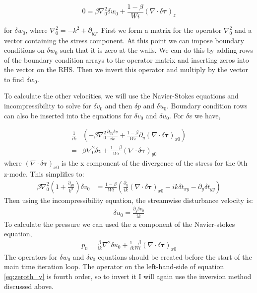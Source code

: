 \documentclass[12pt,a4paper]{article}
\newcommand{\styy}{\delta t_{yy}}
\newcommand{\stxy}{\delta t_{xy}}
\newcommand{\su}{\delta u}
\newcommand{\sv}{\delta v}
\newcommand{\sw}{\delta w}
\newcommand{\spr}{\delta p}
\newcommand{\dd}[1]{\partial_{#1}}
\begin{document}
\begin{equation}
    0 = \beta \nabla_{0}^{2} \sw_{0} + \frac{1-\beta}{Wi} \left( \nabla \cdot \delta \mathbf{\tau} \right)_{z}
\end{equation}

for $\sw_{0}$, where $\nabla_{0}^{2} = -k^{2} + \dd{yy}$. First we form a matrix for the operator $\nabla_{0}^{2}$ and a vector containing the stress component. At this point we can impose boundary conditions on $\sw_{0}$ such that it is zero at the walls. We can do this by adding rows of the boundary condition arrays to the operator matrix and inserting zeros into the vector on the RHS. Then we invert this operator and multiply by the vector to find $\sw_{0}$. 

To calculate the other velocities, we will use the Navier-Stokes equations and incompressibility to solve for $\sv_{0}$ and then $\spr$ and $\su_{0}$. Boundary condition rows can also be inserted into the equations for $\sv_{0}$ and $\su_{0}$. For $\sv$ we have,

\begin{align}
    \frac{1}{ik} & \left( - \beta \nabla_{0}^{2} \frac{\dd{yy} \sv}{ik} + \frac{1-\beta}{Wi} \dd{y} \left( \nabla \cdot \delta \mathbf{\tau} \right)_{x0} \right) \nonumber\\
    = & \beta \nabla_{0}^{2} \sv + \frac{1-\beta}{Wi}\left( \nabla \cdot \delta \mathbf{\tau} \right)_{y0} 
\end{align}
where $\left( \nabla \cdot \delta \mathbf{\tau} \right)_{x0}$ is the x component of the divergence of the stress for the 0th z-mode. This simplifies to:
\begin{align}
    \beta\nabla_{0}^{2}\left( 1+ \frac{\dd{yy}}{k^{2}} \right)\sv_{0} &= \frac{1-\beta}{Wi}\left( \frac{\dd{y}}{ik} \left( \nabla \cdot \delta \mathbf{\tau} \right)_{x0} - ik\stxy - \dd{y}\styy \right)
    \label{eq:zeroth_v}
\end{align}
Then using the incompressibility equation, the streamwise disturbance velocity is:
\begin{align}
    \su_{0} = \frac{\dd{y}\sv_{0}}{ik} 
\end{align}
To calculate the pressure we can used the x component of the Navier-stokes equation,
\begin{align}
    p_{0} = \frac{\beta}{ik}\nabla^{2}\su_{0} + \frac{1-\beta}{ikWi}\left( \nabla \cdot \delta \mathbf{\tau} \right)_{x0}
\end{align}
The operators for $\sw_{0}$ and $\sv_{0}$ equations should be created before the start of the main time iteration loop. The operator on the left-hand-side of equation \ref{eq:zeroth_v} is fourth order, so to invert it I will again use the inversion method discussed above. 
\end{document}

